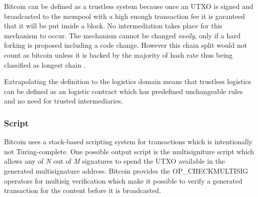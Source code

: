 Bitcoin can be defined as a trustless system because once an UTXO is signed and broadcasted to the mempool with a high enough transaction fee it is garanteed that it will be put inside a block. No intermediation takes place for this mechanism to occur. The mechanism cannot be changed \textit{easily}, only if a hard forking is proposed including a code change. However this chain split would not count as bitcoin unless it is backed by the majority of hash rate thus being classified as longest chain \cite{nakamoto2008bitcoin}. \par
Extrapolating the definition to the logistics domain means that trustless logistics can be defined as an logistic contract which has predefined unchangeable rules and no need for trusted intermediaries.

\subsubsection{Script}

Bitcoin uses a stack-based scripting system for transactions which is intentionally not Turing-complete. One possible output script is the multisigniture script which allows any of \textit{N} out of \textit{M} signatures to spend the UTXO available in the generated multisignature address. Bitcoin provides the OP\_CHECKMULTISIG operators for multisig verification which make it possible to verify a generated transaction for the content before it is broadcasted. \par


%

